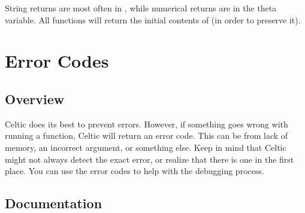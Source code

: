 \documentclass[letterpaper,10pt,english]{sphinxmanual}
\begin{document}
\sphinxAtStartPar
String returns are most often in , while numerical returns are in the theta variable. All functions will return the initial contents of  (in order to preserve it).

\sphinxstepscope


\section{Error Codes}
\label{\detokenize{errorcodes:error-codes}}\label{\detokenize{errorcodes::doc}}

\subsection{Overview}
\label{\detokenize{errorcodes:overview}}
\sphinxAtStartPar
Celtic does its best to prevent errors. However, if something goes wrong with running a function, Celtic will return an error code. This can be from lack of memory, an incorrect argument, or something else.
Keep in mind that Celtic might not always detect the exact error, or realize that there is one in the first place. You can use the error codes to help with the debugging process.


\subsection{Documentation}
\label{\detokenize{errorcodes:documentation}}
\end{document}
